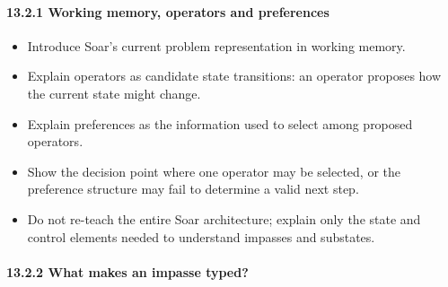 \paragraph{13.2.1 Working memory, operators and preferences}\label{working-memory-operators-and-preferences}

\begin{itemize}
\tightlist
\item
  Introduce Soar's current problem representation in working memory.
\item
  Explain operators as candidate state transitions: an operator proposes how the current state might change.
\item
  Explain preferences as the information used to select among proposed operators.
\item
  Show the decision point where one operator may be selected, or the preference structure may fail to determine a valid next step.
\item
  Do not re-teach the entire Soar architecture; explain only the state and control elements needed to understand impasses and substates.
\end{itemize}

\paragraph{13.2.2 What makes an impasse typed?}\label{what-makes-an-impasse-typed}

